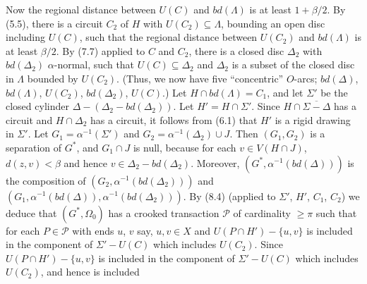 Now the regional distance between $U(C)$ and $bd(\Lambda)$ is at least $1 + \beta/2$. By (5.5), there is a circuit $C_2$ of $H$ with $U(C_2) \subseteq \Lambda$, bounding an open disc including $U(C)$, such that the regional distance between $U(C_2)$ and $bd(\Lambda)$ is at least $\beta/2$. By (7.7) applied to $C$ and $C_2$, there is a closed disc $\Delta_2$ with $bd(\Delta_2)$ $\alpha$-normal, such that $U(C) \subseteq \Delta_2$ and $\Delta_2$ is a subset of the closed disc in $\Lambda$ bounded by $U(C_2)$. (Thus, we now have five ``concentric'' $O$-arcs; $bd(\Delta)$, $bd(\Lambda)$, $U(C_2)$, $bd(\Delta_2)$, $U(C)$.) Let $H \cap bd(\Lambda) = C_1$, and let $\Sigma'$ be the closed cylinder $\Delta - (\Delta_2 - bd(\Delta_2))$. Let $H' = H \cap \Sigma'$. Since $H \cap \overline{\Sigma - \Delta}$ has a circuit and $H \cap \Delta_2$ has a circuit, it follows from (6.1) that $H'$ is a rigid drawing in $\Sigma'$. Let $G_1 = \alpha^{-1}(\Sigma')$ and $G_2 = \alpha^{-1}(\Delta_2) \cup J$. Then $(G_1, G_2)$ is a separation of $G^*$, and $G_1 \cap J$ is null, because for each $v \in V(H \cap J)$, $d(z, v) < \beta$ and hence $v \in \Delta_2 - bd(\Delta_2)$. Moreover, $(G^*, \alpha^{-1}(bd(\Delta)))$ is the composition of $(G_2, \alpha^{-1}(bd(\Delta_2)))$ and $(G_1, \alpha^{-1}(bd(\Delta)), \alpha^{-1}(bd(\Delta_2)))$. By (8.4) (applied to $\Sigma'$, $H'$, $C_1$, $C_2$) we deduce that $(G^*, \Omega_0)$ has a crooked transaction $\mathscr{P}$ of cardinality $\ge \pi$ such that for each $P \in \mathscr{P}$ with ends $u$, $v$ say, $u, v \in X$ and $U(P \cap H') - \{u, v\}$ is included in the component of $\Sigma' - U(C)$ which includes $U(C_2)$. Since $U(P \cap H') - \{u, v\}$ is included in the component of $\Sigma' - U(C)$ which includes $U(C_2)$, and hence is included
